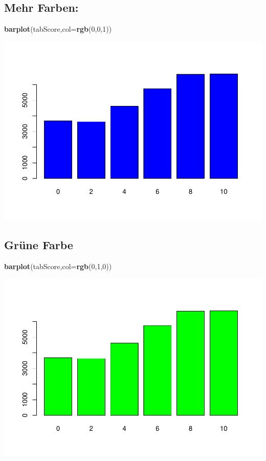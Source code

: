 \documentclass[]{article}
\newenvironment{Shaded}{\begin{snugshade}}{\end{snugshade}}
\newcommand{\KeywordTok}[1]{\textcolor[rgb]{0.13,0.29,0.53}{\textbf{{#1}}}}
\newcommand{\DataTypeTok}[1]{\textcolor[rgb]{0.13,0.29,0.53}{{#1}}}
\newcommand{\DecValTok}[1]{\textcolor[rgb]{0.00,0.00,0.81}{{#1}}}
\newcommand{\NormalTok}[1]{{#1}}
\begin{document}
\subsection{Mehr Farben:}\label{mehr-farben}

\begin{Shaded}
\begin{Highlighting}[]
\KeywordTok{barplot}\NormalTok{(tabScore,}\DataTypeTok{col=}\KeywordTok{rgb}\NormalTok{(}\DecValTok{0}\NormalTok{,}\DecValTok{0}\NormalTok{,}\DecValTok{1}\NormalTok{))}
\end{Highlighting}
\end{Shaded}

\includegraphics{Intro_Datenanalyse1_files/figure-latex/unnamed-chunk-147-1.pdf}

\subsection{Grüne Farbe}\label{grune-farbe}

\begin{Shaded}
\begin{Highlighting}[]
\KeywordTok{barplot}\NormalTok{(tabScore,}\DataTypeTok{col=}\KeywordTok{rgb}\NormalTok{(}\DecValTok{0}\NormalTok{,}\DecValTok{1}\NormalTok{,}\DecValTok{0}\NormalTok{))}
\end{Highlighting}
\end{Shaded}

\includegraphics{Intro_Datenanalyse1_files/figure-latex/unnamed-chunk-148-1.pdf}
\end{document}
